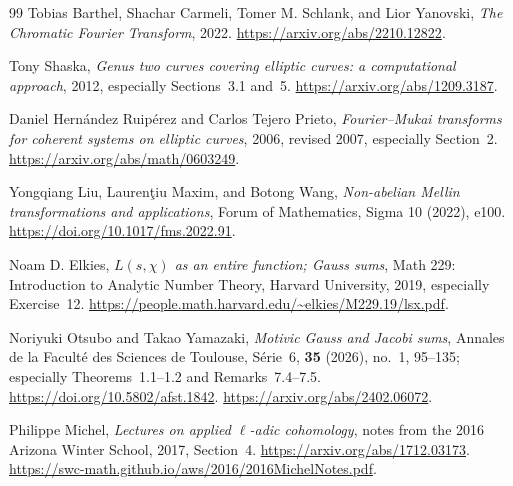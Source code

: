 \documentclass[11pt]{article}
\theoremstyle{remark}
\begin{document}
\begin{thebibliography}{99}
Tobias Barthel, Shachar Carmeli, Tomer M. Schlank, and Lior Yanovski, \emph{The Chromatic Fourier Transform}, 2022.
\url{https://arxiv.org/abs/2210.12822}.

Tony Shaska, \emph{Genus two curves covering elliptic curves: a computational approach}, 2012, especially Sections~3.1 and~5.
\url{https://arxiv.org/abs/1209.3187}.

Daniel Hern\'andez Ruip\'erez and Carlos Tejero Prieto, \emph{Fourier--Mukai transforms for coherent systems on elliptic curves}, 2006, revised 2007, especially Section~2.
\url{https://arxiv.org/abs/math/0603249}.

Yongqiang Liu, Lauren\c{t}iu Maxim, and Botong Wang,
\emph{Non-abelian Mellin transformations and applications},
Forum of Mathematics, Sigma 10 (2022), e100.
\url{https://doi.org/10.1017/fms.2022.91}.

Noam D. Elkies, \emph{\(L(s,\chi)\) as an entire function; Gauss sums}, Math 229: Introduction to Analytic Number Theory, Harvard University, 2019, especially Exercise~12.
\url{https://people.math.harvard.edu/~elkies/M229.19/lsx.pdf}.

Noriyuki Otsubo and Takao Yamazaki, \emph{Motivic Gauss and Jacobi sums}, Annales de la Facult\'e des Sciences de Toulouse, S\'erie~6, \textbf{35} (2026), no.~1, 95--135; especially Theorems~1.1--1.2 and Remarks~7.4--7.5.
\url{https://doi.org/10.5802/afst.1842}.
\url{https://arxiv.org/abs/2402.06072}.

Philippe Michel, \emph{Lectures on applied \(\ell\)-adic cohomology}, notes from the 2016 Arizona Winter School, 2017, Section~4.
\url{https://arxiv.org/abs/1712.03173}.
\url{https://swc-math.github.io/aws/2016/2016MichelNotes.pdf}.

\end{thebibliography}
\end{document}
